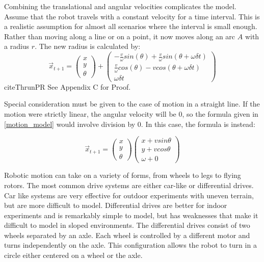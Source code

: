 \documentclass[12pt]{report}
\begin{document}
Combining the translational and angular velocities complicates the model.  Assume that the robot travels with a constant velocity for a time interval.  This is a realistic assumption for almost all scenarios where the interval is small enough.  Rather than moving along a line or on a point, it now moves along an arc $A$ with a radius $r$.  The new  radius is calculated by: 
\begin{equation}
\label{motion_model}
\vec{x}_{t+1}=
\begin{pmatrix}
 x \\
 y \\
\theta
\end{pmatrix}  +
\begin{pmatrix}
 -\frac{v}{\omega} sin(\theta)+\frac{v}{\omega} sin(\theta + \omega \delta t) \\
 \frac{v}{\omega} cos(\theta)-v cos(\theta + \omega \delta t)  \\
\omega \delta t
\end{pmatrix}
\end{equation}
cite{ThrunPR}
{See Appendix C for Proof}.  

Special consideration must be given to the case of motion in a straight line.  If the motion were strictly linear, the angular velocity will be 0, so the formula given in \ref{motion_model} would involve division by 0.  In this case, the formula is instead:

\begin{equation}
\label{motion_linear}
\vec{x}_{t+1} =
\begin{pmatrix}
 x \\
 y \\
\theta
\end{pmatrix}
\begin{pmatrix}
 x + v sin \theta \\
 y + v cos \theta  \\
\omega + 0
\end{pmatrix}
\end{equation}

Robotic motion can take on a variety of forms, from wheels to legs to flying rotors.  The most common drive systems are either car-like or differential drives.  Car like systems are very effective for outdoor experiments with uneven terrain, but are more difficult to model.  Differential drives are better for indoor experiments and is remarkably simple to model, but has weaknesses that make it difficult to model in sloped environments.  The differential drives consist of two wheels separated by an axle.  Each wheel is controlled by a different motor and turns independently on the axle.  This configuration allows the robot to turn in a circle either centered on a wheel or the axle.  
\end{document}
